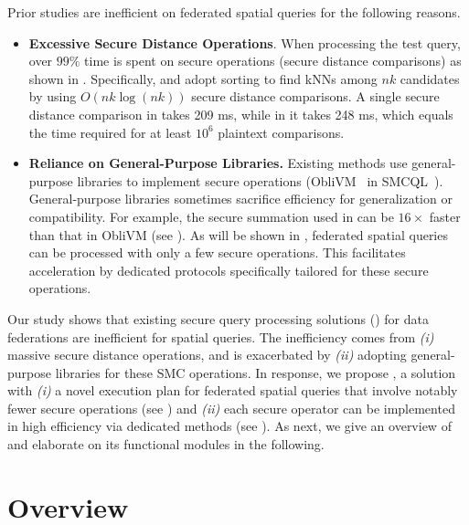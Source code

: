 Prior studies are inefficient on federated spatial queries for the following reasons.
\begin{itemize}
    \item \textbf{Excessive Secure Distance Operations}.
    When processing the test query, over $99\%$ time is spent on secure operations (\eg secure distance comparisons) as shown in .
    Specifically, \smcql and \conclave adopt sorting to find kNNs among $nk$ candidates by using $O(nk \log(nk))$ secure distance comparisons.
    A single secure distance comparison in \smcql takes 209 ms, while in \conclave it takes 248 ms, which equals the time required for at least $10^6$ plaintext comparisons.
	
    \item \textbf{Reliance on General-Purpose Libraries.}
    Existing methods use general-purpose libraries to implement secure operations (\eg ObliVM~\cite{DBLP:conf/sp/LiuWNHS15} in SMCQL~\cite{vldb17smcql}). 
    General-purpose libraries sometimes sacrifice efficiency for generalization or compatibility.
    For example, the secure summation used in \sysname can be $16\times$ faster than that in ObliVM (see ).
    As will be shown in , federated spatial queries can be processed with only a few secure operations.
    This facilitates acceleration by dedicated protocols specifically tailored for these secure operations.
\end{itemize}

Our study shows that existing secure query processing solutions (\eg \cite{vldb17smcql, eurosys19conclave}) for data federations are inefficient for spatial queries.
The inefficiency comes from \textit{(i)} massive secure distance operations, and is exacerbated by \textit{(ii)} adopting general-purpose libraries for these SMC operations.
In response, we propose \sysname, a solution with \textit{(i)} a novel execution plan for federated spatial queries that involve notably fewer secure operations 
(see ) and \textit{(ii)} each secure operator can be implemented in high efficiency via dedicated methods (see ).
As next, we give an overview of \sysname and elaborate on its functional modules in the following.


\section{\sysname Overview}
\label{sec:overview}

